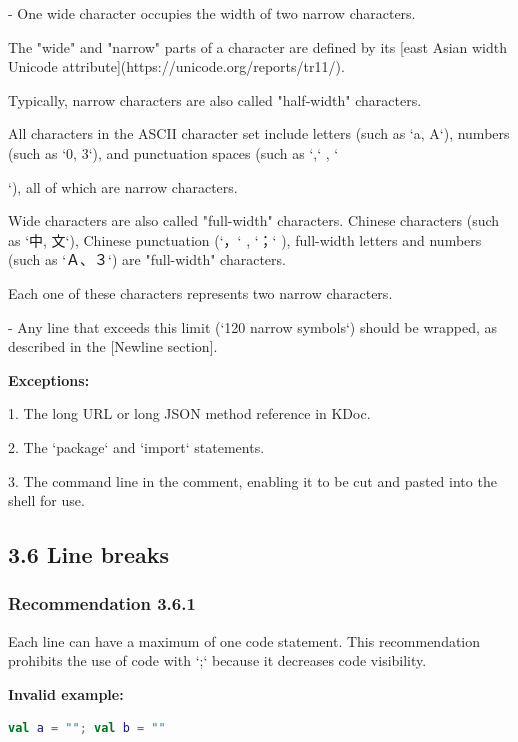 - One wide character occupies the width of two narrow characters.

The "wide" and "narrow" parts of a character are defined by its [east Asian width Unicode attribute](https://unicode.org/reports/tr11/).

Typically, narrow characters are also called "half-width" characters.

All characters in the ASCII character set include letters (such as `a, A`), numbers (such as `0, 3`), and punctuation spaces (such as `,` , `{`), all of which are narrow characters.

Wide characters are also called "full-width" characters. Chinese characters (such as `中, 文`), Chinese punctuation (`，` , `；` ), full-width letters and numbers (such as `Ａ、３`) are "full-width" characters.

Each one of these characters represents two narrow characters.



- Any line that exceeds this limit (`120 narrow symbols`) should be wrapped, as described in the [Newline section].



\textbf{Exceptions:}



1.	The long URL or long JSON method reference in KDoc.

2.	The `package` and `import` statements.

3.	The command line in the comment, enabling it to be cut and pasted into the shell for use.



\subsection*{\textbf{3.6 Line breaks}}

\subsubsection*{\textbf{Recommendation 3.6.1}}
\leavevmode\newline

Each line can have a maximum of one code statement. This recommendation prohibits the use of code with `;` because it decreases code visibility.



\textbf{Invalid example:}

\begin{lstlisting}[language=Kotlin]
val a = ""; val b = ""
\end{lstlisting}


}
